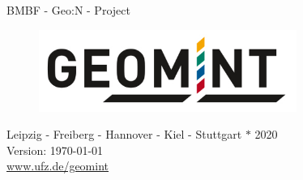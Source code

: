 
\begin{center}

\quad
\vspace{2cm}
\quad

\Huge
BMBF - Geo:N - Project
\\[3cm]
\begin{figure}[htbp]
\centering
\includegraphics[width=0.75\textwidth]{figures/geomint-logo}
\end{figure}

\vfill
\Large
Leipzig - Freiberg - Hannover - Kiel - Stuttgart $\ast$ 2020
\\[1ex]
Version: \today
\\[1ex]
\url{www.ufz.de/geomint}
\end{center}
\normalsize
